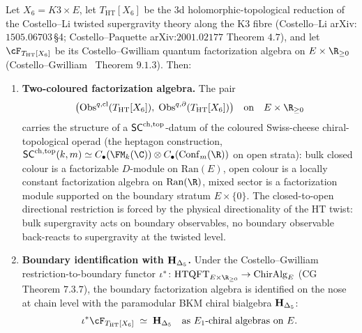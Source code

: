 \begin{proposition}
\label{prop:qgfnd-clp-3d-ht-k3e-boundary-chiral-algebra}%
%
%
Let $X_6=K3\times E$, let $T_{\mathrm{HT}}[X_6]$ be the
$3$d holomorphic-topological reduction of the Costello--Li twisted
supergravity theory along the K3 fibre (Costello--Li
arXiv:$1505.06703$\,\S 4; Costello--Paquette arXiv:$2001.02177$
Theorem $4.7$), and let $\cF_{T_{\mathrm{HT}}[X_6]}$ be its
Costello--Gwilliam quantum factorization algebra on $E\times\R_{\geq 0}$
(Costello--Gwilliam~\cite{CG21} Theorem $9.1.3$). Then:
\begin{enumerate}[label=\textup{(\alph*)}]
\item \textbf{Two-coloured factorization algebra.} The pair
\[
 \bigl(\Obsbulk(T_{\mathrm{HT}}[X_6]),\;\Obsbd(T_{\mathrm{HT}}[X_6])\bigr)
 \quad\text{on}\quad
 E\times\R_{\geq 0}
\]
carries the structure of a $\mathsf{SC}^{\mathrm{ch,top}}$-datum of the coloured Swiss-cheese
chiral-topological operad (the heptagon construction,
$\SCchtop(k,m)\simeq C_\bullet(\FM_k(\C))\otimes C_\bullet(\mathrm{Conf}_m(\R))$
on open strata): bulk closed colour is a factorizable $D$-module on
$\mathrm{Ran}(E)$, open colour is a locally constant factorization
algebra on $\mathrm{Ran}(\R)$, mixed sector is a factorization module
supported on the boundary stratum $E\times\{0\}$. The
closed-to-open directional restriction is forced by the physical
directionality of the HT twist: bulk supergravity acts on boundary
observables, no boundary observable back-reacts to supergravity
at the twisted level.
\item \textbf{Boundary identification with $\mathbf{H}_{\Delta_5}$.} Under the
Costello--Gwilliam restriction-to-boundary functor
$\iota^*\colon \HTQFT_{E\times\R_{\geq 0}}\to\mathrm{ChirAlg}_E$
(CG~\cite{CG21} Theorem $7.3.7$), the boundary factorization
algebra is identified on the nose at chain level with the
paramodular BKM chiral bialgebra $\mathbf{H}_{\Delta_5}$:
\begin{equation}
 \label{eq:qgfnd-clp-boundary-chiral-algebra}
 \iota^*\cF_{T_{\mathrm{HT}}[X_6]}
 \;\simeq\;
 \HDelta\quad\text{as $E_1$-chiral algebras on $E$}.
\end{equation}

\end{enumerate}
\end{proposition}
